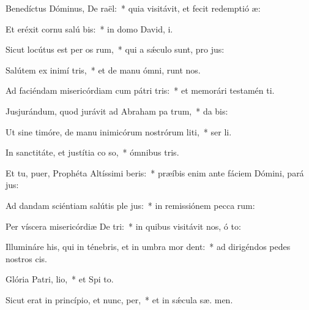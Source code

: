 \item Benedíctus Dóminus, De raël:~* quia visitávit, et fecit redemptió  æ:
\item Et eréxit cornu salú bis:~* in domo David,  i.
\item Sicut locútus est per os rum,~* qui a sǽculo sunt, pro jus:
\item Salútem ex inimí tris,~* et de manu ómni,  runt nos.
\item Ad faciéndam misericórdiam cum pátri tris:~* et memorári testamén  ti.
\item Jusjurándum, quod jurávit ad Abraham pa trum,~* da  bis:
\item Ut sine timóre, de manu inimicórum nostrórum liti,~* ser li.
\item In sanctitáte, et justítia co so,~* ómnibus  tris.
\item Et tu, puer, Prophéta Altíssimi beris:~* præíbis enim ante fáciem Dómini, pará  jus:
\item Ad dandam sciéntiam salútis ple jus:~* in remissiónem pecca rum:
\item Per víscera misericórdiæ De tri:~* in quibus visitávit nos, ó  to:
\item Illumináre his, qui in ténebris, et in umbra mor dent:~* ad dirigéndos pedes nostros   cis.
\item Glória Patri,  lio,~* et Spi to.
\item Sicut erat in princípio, et nunc,  per,~* et in sǽcula sæ. men.
